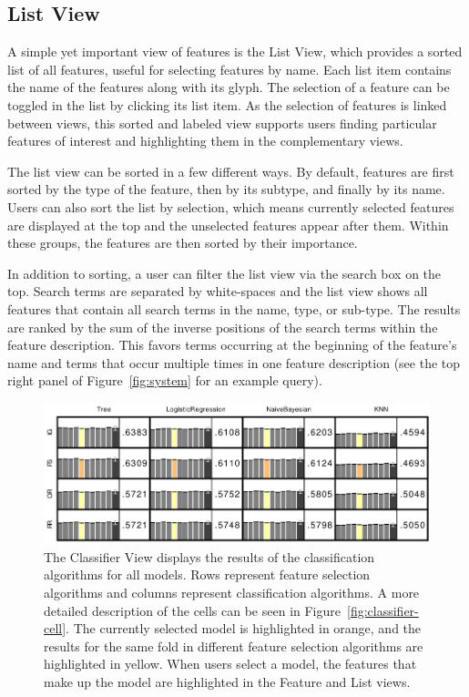 \subsection{List View}
A simple yet important view of features is the List View, which provides a sorted list of all features, useful for selecting features by name.  Each list item contains the name of the features along with its glyph.  The selection of a feature can be toggled in the list by clicking its list item.  As the selection of features is linked between views, this sorted and labeled view supports users finding particular features of interest and highlighting them in the complementary views.

The list view can be sorted in a few different ways. By default, features are first sorted by
the type of the feature, then by its subtype, and finally by its name.  Users can also sort the list by selection, which means currently selected features are displayed at the top and the unselected features appear after them.  Within these groups, the features are then sorted by their importance.

In addition to sorting, a user can filter the list view via the search box on
the top.
Search terms are separated by white-spaces and the list view
shows all features that contain all search terms in the name, type, or
sub-type.
The results are ranked by the sum of the inverse positions
of the search terms within the feature description.
This favors terms occurring at the beginning of the feature's name
and terms that occur multiple times in one feature description
(see the top right panel of Figure~\ref{fig:system} for an example query).

\begin{figure}[t]
\centering
\includegraphics[width=0.7\linewidth]{infuse/classifier}
\caption[The Classifier View.]{The Classifier View displays the results of the classification algorithms for all models.
Rows represent feature selection algorithms and columns represent classification algorithms.
A more detailed description of the cells can be
seen in Figure~\ref{fig:classifier-cell}.
The currently selected model is highlighted in orange, and the results for the same fold in different
feature selection algorithms are highlighted in yellow.  When users select a model, the features that make up the model are highlighted in the Feature and List views.
}
\label{fig:classifier}
\end{figure}

